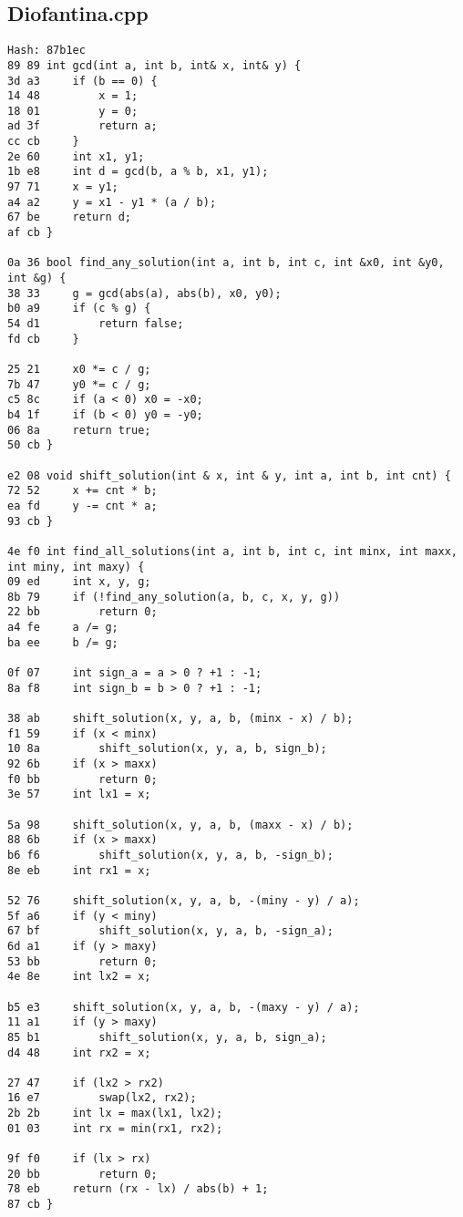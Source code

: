 \documentclass[11pt, a4paper, twoside]{article}
\begin{document}
\subsection{Diofantina.cpp}
\begin{lstlisting}
Hash: 87b1ec
89 89 int gcd(int a, int b, int& x, int& y) {
3d a3     if (b == 0) {
14 48         x = 1;
18 01         y = 0;
ad 3f         return a;
cc cb     }
2e 60     int x1, y1;
1b e8     int d = gcd(b, a % b, x1, y1);
97 71     x = y1;
a4 a2     y = x1 - y1 * (a / b);
67 be     return d;
af cb }

0a 36 bool find_any_solution(int a, int b, int c, int &x0, int &y0, int &g) {
38 33     g = gcd(abs(a), abs(b), x0, y0);
b0 a9     if (c % g) {
54 d1         return false;
fd cb     }
      
25 21     x0 *= c / g;
7b 47     y0 *= c / g;
c5 8c     if (a < 0) x0 = -x0;
b4 1f     if (b < 0) y0 = -y0;
06 8a     return true;
50 cb }

e2 08 void shift_solution(int & x, int & y, int a, int b, int cnt) {
72 52     x += cnt * b;
ea fd     y -= cnt * a;
93 cb }

4e f0 int find_all_solutions(int a, int b, int c, int minx, int maxx, int miny, int maxy) {
09 ed     int x, y, g;
8b 79     if (!find_any_solution(a, b, c, x, y, g))
22 bb         return 0;
a4 fe     a /= g;
ba ee     b /= g;
      
0f 07     int sign_a = a > 0 ? +1 : -1;
8a f8     int sign_b = b > 0 ? +1 : -1;
      
38 ab     shift_solution(x, y, a, b, (minx - x) / b);
f1 59     if (x < minx)
10 8a         shift_solution(x, y, a, b, sign_b);
92 6b     if (x > maxx)
f0 bb         return 0;
3e 57     int lx1 = x;
      
5a 98     shift_solution(x, y, a, b, (maxx - x) / b);
88 6b     if (x > maxx)
b6 f6         shift_solution(x, y, a, b, -sign_b);
8e eb     int rx1 = x;
      
52 76     shift_solution(x, y, a, b, -(miny - y) / a);
5f a6     if (y < miny)
67 bf         shift_solution(x, y, a, b, -sign_a);
6d a1     if (y > maxy)
53 bb         return 0;
4e 8e     int lx2 = x;
      
b5 e3     shift_solution(x, y, a, b, -(maxy - y) / a);
11 a1     if (y > maxy)
85 b1         shift_solution(x, y, a, b, sign_a);
d4 48     int rx2 = x;
      
27 47     if (lx2 > rx2)
16 e7         swap(lx2, rx2);
2b 2b     int lx = max(lx1, lx2);
01 03     int rx = min(rx1, rx2);
      
9f f0     if (lx > rx)
20 bb         return 0;
78 eb     return (rx - lx) / abs(b) + 1;
87 cb }
\end{lstlisting}
\end{document}
